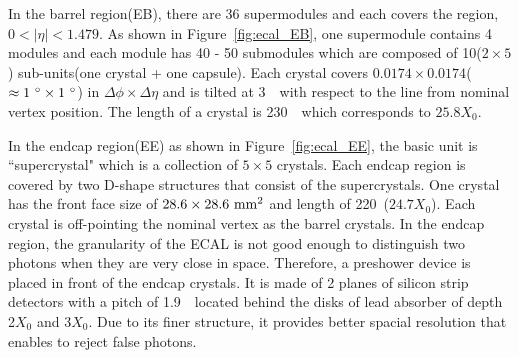 In the barrel region(EB), there are 36 supermodules and each covers 
the region, $0 < |\eta| < 1.479$. 
As shown in Figure~\ref{fig:ecal_EB}, one supermodule contains 4 modules 
and each module has 40 - 50 submodules 
which are composed of 10($2 \times 5$) sub-units(one crystal + one capsule). 
Each crystal covers $0.0174 \times 0.0174$($\approx 1~^\circ \times 1~^\circ$)
in $\Delta \phi \times \Delta \eta$ and is tilted at 3~\dg\ with respect to the line 
from nominal vertex position. %
The length of a crystal is 230~\mm\ which corresponds to $25.8X_0$.

In the endcap region(EE) as shown in Figure~\ref{fig:ecal_EE}, 
the basic unit is ``supercrystal" which is a collection of $5 \times 5$ crystals. 
Each endcap region is covered by two D-shape structures that consist of 
the supercrystals. One crystal has the front face size of $28.6 \times 28.6~\mathrm{mm}^2$ 
and length of 220~\mm($24.7X_0$).
Each crystal is off-pointing the nominal vertex as the barrel crystals.  
In the endcap region, the granularity of the ECAL is not good enough 
to distinguish two photons when they are very close in space.  
Therefore, a preshower device is placed in front of the endcap crystals. 
It is made of 2 planes of silicon strip detectors with a pitch of 1.9~\mm\ 
located behind the disks of lead absorber of depth 2$X_0$ and 3$X_0$.
Due to its finer structure, it provides better spacial resolution 
that enables to reject false photons.  


